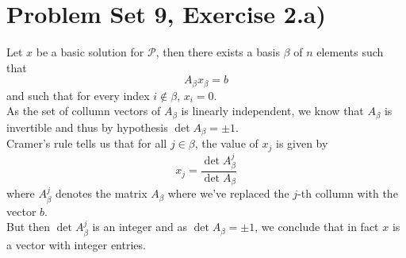 \message{ !name(Ex.tex)}\documentclass[11pt, a4paper]{article}
\begin{document}
\section{Problem Set 9, Exercise 2.a)}
Let $x$ be a basic solution for $ \mathcal{P}$, then there exists a basis $\beta$ of $n$ elements such that 
\[ 
A_\beta x_\beta = b
\]
and such that for every index $i\notin \beta$, $x_i=0$.\\
As the set of collumn vectors of $A_\beta$ is linearly independent, we know that $A_\beta$ is invertible and thus by hypothesis $\det A_\beta = \pm 1 $.\\
Cramer's rule tells us that for all $j\in \beta$, the value of $x_j$ is given by
\[ 
x_j = \frac{ \det A_\beta^{j}}{ \det A_\beta}
\]
where $A_\beta^{j}$ denotes the matrix $A_\beta$ where we've replaced the $j$-th collumn with the vector $b$.\\
But then $\det A_\beta^{j}$ is an integer and as $\det A_\beta= \pm 1$, we conclude that in fact $x$ is a vector with integer entries.
\end{document}
